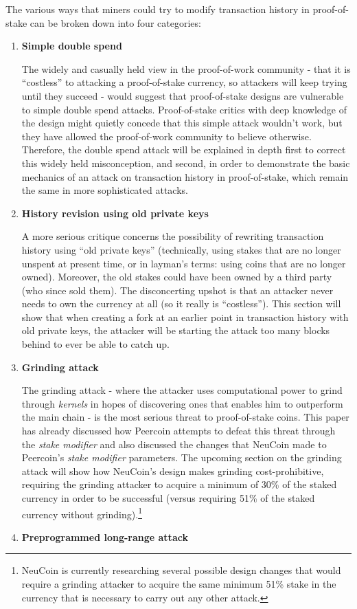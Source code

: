\documentclass[a4paper,11pt]{article}
\begin{document}
The various ways that miners could try to modify transaction history in proof-of-stake can be broken down into four categories:
\begin{enumerate}
\item{\textbf{Simple double spend}

The widely and casually held view in the proof-of-work community - that it is ``costless'' to attacking a proof-of-stake currency, so attackers will keep trying until they succeed - would suggest that proof-of-stake designs are vulnerable to simple double spend attacks. Proof-of-stake critics with deep knowledge of the design might quietly concede that this simple attack wouldn't work, but they have allowed the proof-of-work community to believe otherwise. Therefore, the double spend attack will be explained in depth first to correct this widely held misconception, and second, in order to demonstrate the basic mechanics of an attack on transaction history in proof-of-stake, which remain the same in more sophisticated attacks. }

\item{\textbf{History revision using old private keys}

A more serious critique concerns the possibility of rewriting transaction history using ``old private keys'' (technically, using stakes that are no longer unspent at present time, or in layman's terms: using coins that are no longer owned). Moreover, the old stakes could have been owned by a third party (who since sold them). The disconcerting upshot is that an attacker never needs to own the currency at all (so it really is ``costless''). This section will show that when creating a fork at an earlier point in transaction history with old private keys, the attacker will be starting the attack too many blocks behind to ever be able to catch up.  }
\item{\textbf{Grinding attack}

The grinding attack - where the attacker uses computational power to grind through \textit{kernels} in hopes of discovering ones that enables him to outperform the main chain - is the most serious threat to proof-of-stake coins. This paper has already discussed how Peercoin attempts to defeat this threat through the \textit{stake modifier} and also discussed the changes that NeuCoin made to Peercoin's \textit{stake modifier} parameters. The upcoming section on the grinding attack will show how NeuCoin's design makes grinding cost-prohibitive, requiring the grinding attacker to acquire a minimum of 30\% of the staked currency in order to be successful (versus requiring 51\% of the staked currency without grinding).\footnote{NeuCoin is currently researching several possible design changes that would require a grinding attacker to acquire the same minimum 51\% stake in the currency that is necessary to carry out any other attack.} }
\item{\textbf{Preprogrammed long-range attack}

}
\end{enumerate}
\end{document}
